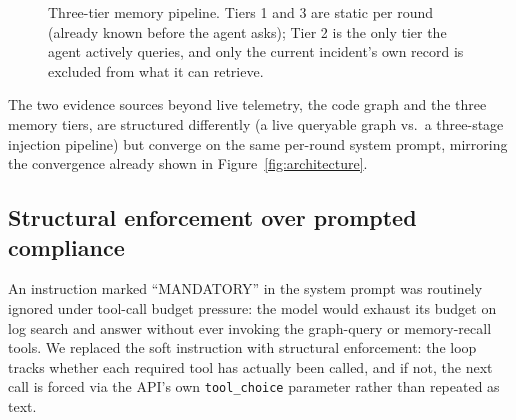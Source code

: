 \documentclass[conference]{IEEEtran}
\begin{document}
\begin{figure}[t]
\centering
{}
\caption{Three-tier memory pipeline. Tiers 1 and 3 are static per round (already known before the agent asks);
Tier 2 is the only tier the agent actively queries, and only the current incident's own record is excluded from
what it can retrieve.}
\label{fig:memoryflow}
\end{figure}

The two evidence sources beyond live telemetry, the code graph and the three memory tiers, are structured
differently (a live queryable graph vs.\ a three-stage injection pipeline) but converge on the same per-round
system prompt, mirroring the convergence already shown in Figure~\ref{fig:architecture}.

\subsection{Structural enforcement over prompted compliance}
\label{sec:enforcement}

An instruction marked ``MANDATORY'' in the system prompt was routinely ignored under tool-call budget
pressure: the model would exhaust its budget on log search and answer without ever invoking the graph-query or
memory-recall tools. We replaced the soft instruction with structural enforcement: the loop tracks whether
each required tool has actually been called, and if not, the next call is forced via the API's own
\texttt{tool\_choice} parameter rather than repeated as text.
\end{document}
